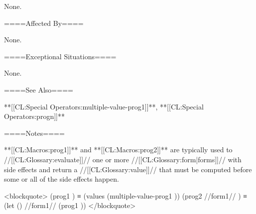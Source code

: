 None.

====Affected By====

None.

====Exceptional Situations====

None.

====See Also====

**[[CL:Special Operators:multiple-value-prog1]]**, **[[CL:Special Operators:progn]]**

====Notes====

**[[CL:Macros:prog1]]** and **[[CL:Macros:prog2]]** are typically used to //[[CL:Glossary:evaluate]]// one or more //[[CL:Glossary:form|forms]]// with side effects and return a //[[CL:Glossary:value]]// that must be computed before some or all of the side effects happen.

<blockquote> (prog1 ) ≡ (values (multiple-value-prog1 )) (prog2 //form1// ) ≡ (let () //form1// (prog1 )) </blockquote>

